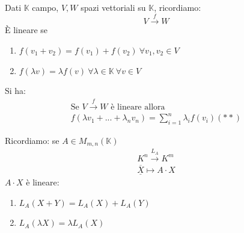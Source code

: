 



Dati $\mathbb{K}$ campo, $V,W$ spazi vettoriali su $\mathbb{K}$, ricordiamo:
\begin{equation}
    V\xrightarrow{f}W
\end{equation}
È lineare se
\begin{enumerate}
    \item $f(v_1+v_2)=f(v_1)+f(v_2)\ \forall v_1,v_2\in V$
    \item $f(\lambda v)=\lambda f(v)\ \forall \lambda\in \mathbb{K}\ \forall v\in V$
\end{enumerate}
Si ha:
\begin{gather}
    \text{Se }V\xrightarrow{f} W \text{ è lineare allora} \\
    f(\lambda v_1+...+\lambda_n v_n)=\sum_{i=1}^{n}\lambda_i f(v_i) (**)
\end{gather}

Ricordiamo: se $A\in M _{m,n}(\mathbb{K})$
\begin{align}
    K^n\xrightarrow{L_A}K^m \\
    \overline{\underline{X}} \mapsto A\cdot X
\end{align}
$A\cdot X$ è lineare:
\begin{enumerate}
    \item $L_A (X+Y)= L_A(X)+L_A(Y)$
    \item $L_A(\lambda X)=\lambda L_A(X)$
\end{enumerate}

